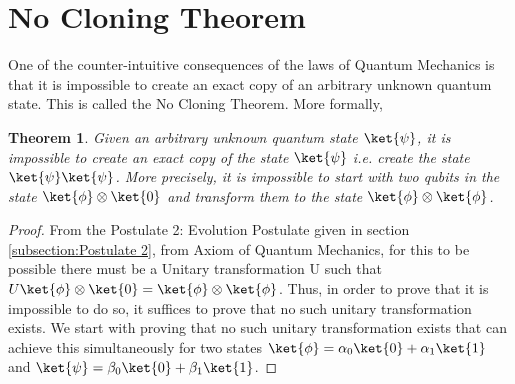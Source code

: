 \documentclass[12pt, oneside]{book}
\newtheorem{theorem}{Theorem}[section]
\theoremstyle{definition}
\theoremstyle{definition}
\theoremstyle{remark}
\begin{document}
\section{No Cloning Theorem}
One of the counter-intuitive consequences of the laws of Quantum Mechanics is that 
it is impossible to create an exact copy of an arbitrary unknown quantum state. This is called the No Cloning Theorem.
More formally, 
\begin{theorem}
    Given an arbitrary unknown quantum state $\ket{\psi}$, it is impossible to create an exact copy of the state $\ket{\psi}$
    i.e. create the state $\ket{\psi}\ket{\psi}$. More precisely, it is impossible to start with two qubits in the state $\ket{\phi} \otimes \ket{0}$ and transform them to the state $\ket{\phi} \otimes \ket{\phi}$.
\end{theorem}
\begin{proof}
    From the Postulate 2: Evolution Postulate given in section \ref{subsection:Postulate 2}, from Axiom of Quantum Mechanics, for this to be possible there must be a Unitary transformation U such that $U\ket{\phi}\otimes \ket{0} = \ket{\phi}\otimes \ket{\phi}$. Thus, in order to prove that it is impossible to do so, it suffices to prove that no such unitary transformation exists. We start with proving that no such unitary transformation exists that can achieve this simultaneously for two states $\ket{\phi}=\alpha_0\ket{0}+\alpha_1\ket{1}$ and $\ket{\psi}=\beta_0\ket{0}+\beta_1\ket{1}$.


\end{proof}
\end{document}
